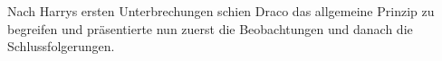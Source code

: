 Nach Harrys ersten Unterbrechungen schien Draco das allgemeine Prinzip zu begreifen und präsentierte nun zuerst die Beobachtungen und danach die Schlussfolgerungen.

